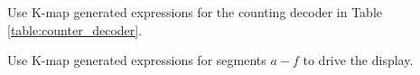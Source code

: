 %
%
\begin{problem}
Use  K-map generated expressions for the counting decoder in Table \ref{table:counter_decoder}.
\end{problem}
%
%
\begin{problem}
Use  K-map generated expressions for segments $a-f$  to drive the display.
\end{problem}
%



